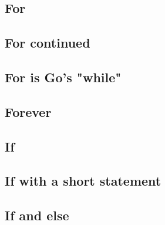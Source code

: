 \subsection{For}





\subsection{For continued}





\subsection{For is Go's "while"}




\subsection{Forever}




\subsection{If}




\subsection{If with a short statement}





\subsection{If and else}




